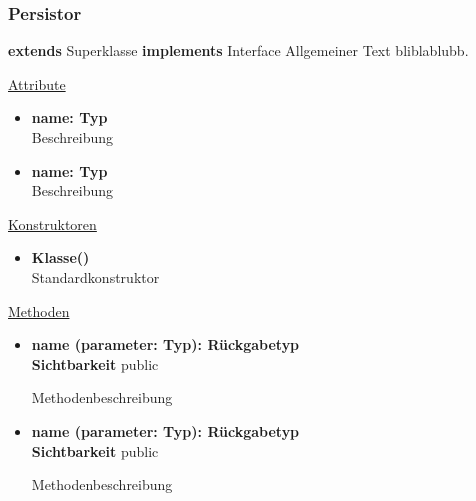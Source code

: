 \subsubsection{Persistor}
\textbf{extends} Superklasse \newline
\textbf{implements} Interface \newline
Allgemeiner Text bliblablubb. \newline

\underline{Attribute}
\begin{itemize}
\itemsep0pt
\item \textbf{name: Typ} \hfill\\ 
Beschreibung

\item \textbf{name: Typ} \hfill\\ 
Beschreibung
\end{itemize}

\underline{Konstruktoren}
\begin{itemize}
\itemsep0pt
\item \textbf{Klasse()} \hfill\\
Standardkonstruktor
\end{itemize}

\underline{Methoden}
\begin{itemize}
\itemsep0pt
\item \textbf{name (parameter: Typ): Rückgabetyp}\hfill\\
\textbf{Sichtbarkeit} public

Methodenbeschreibung

\item \textbf{name (parameter: Typ): Rückgabetyp}\hfill\\
\textbf{Sichtbarkeit} public

Methodenbeschreibung

\end{itemize}